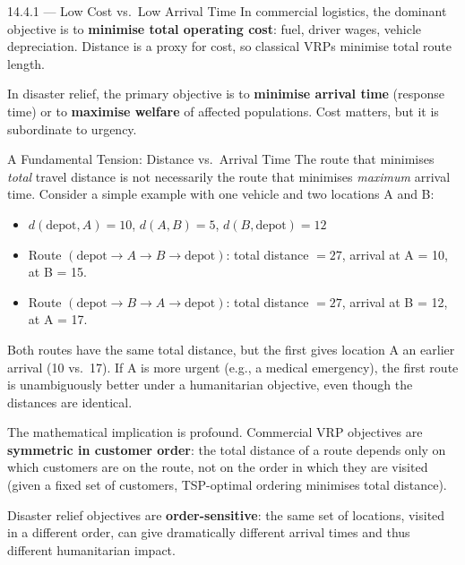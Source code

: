 \documentclass[aspectratio=169,10pt]{beamer}
\begin{document}
\begin{frame}[allowframebreaks]{14.4.1 --- Low Cost vs.\ Low Arrival Time}
  In commercial logistics, the dominant objective is to
  \textbf{minimise total operating cost}: fuel, driver wages, vehicle
  depreciation.
  Distance is a proxy for cost, so classical VRPs minimise total route
  length.

  \medskip
  In disaster relief, the primary objective is to
  \textbf{minimise arrival time} (response time) or to
  \textbf{maximise welfare} of affected populations.
  Cost matters, but it is subordinate to urgency.

  \medskip
  \begin{block}{A Fundamental Tension: Distance vs.\ Arrival Time}
    The route that minimises \emph{total} travel distance is not
    necessarily the route that minimises \emph{maximum} arrival time.
    Consider a simple example with one vehicle and two locations A and B:
    \begin{itemize}
      \item $d(\text{depot}, A) = 10$, $d(A, B) = 5$, $d(B, \text{depot}) = 12$
      \item Route $(\text{depot} \to A \to B \to \text{depot})$:
            total distance $= 27$, arrival at A = 10, at B = 15.
      \item Route $(\text{depot} \to B \to A \to \text{depot})$:
            total distance $= 27$, arrival at B = 12, at A = 17.
    \end{itemize}
    Both routes have the same total distance, but the first gives
    location A an earlier arrival (10 vs.\ 17).
    If A is more urgent (e.g., a medical emergency), the first route
    is unambiguously better under a humanitarian objective,
    even though the distances are identical.
  \end{block}

  \framebreak

  The mathematical implication is profound.
  Commercial VRP objectives are \textbf{symmetric in customer order}:
  the total distance of a route depends only on which customers are
  on the route, not on the order in which they are visited (given a
  fixed set of customers, TSP-optimal ordering minimises total distance).

  \medskip
  Disaster relief objectives are \textbf{order-sensitive}:
  the same set of locations, visited in a different order, can give
  dramatically different arrival times and thus different humanitarian
  impact.


\end{frame}
\end{document}
